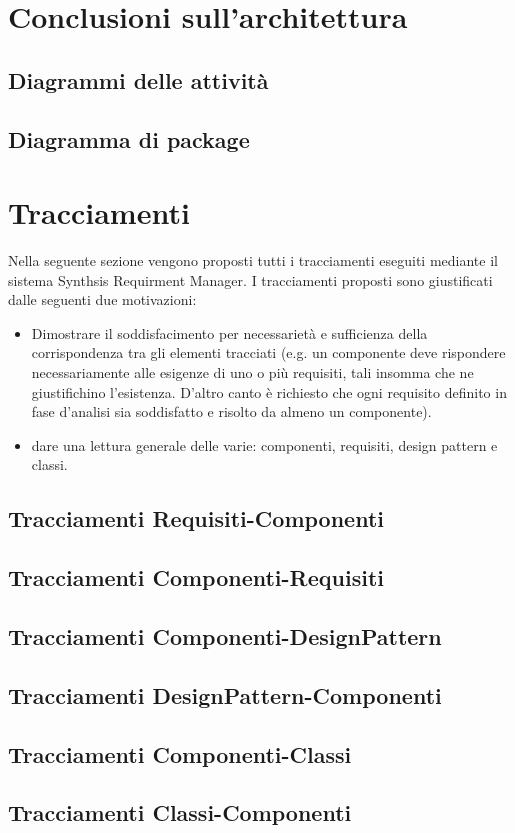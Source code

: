 \clearpage

\section{Conclusioni sull'architettura}

\subsection{Diagrammi delle attività}

\subsection{Diagramma di package}

\clearpage

\section{Tracciamenti}
Nella seguente sezione vengono proposti tutti i tracciamenti eseguiti mediante il sistema Synthsis Requirment Manager. I tracciamenti proposti sono giustificati dalle seguenti due motivazioni:

\begin{itemize}
	\item Dimostrare il soddisfacimento per necessarietà e sufficienza della corrispondenza tra gli elementi tracciati (e.g. un componente deve rispondere necessariamente alle esigenze di uno o più requisiti, tali insomma che ne giustifichino l'esistenza. D'altro canto è richiesto che ogni requisito definito in fase d'analisi sia soddisfatto e risolto da almeno un componente).
	\item dare una lettura generale delle varie: componenti, requisiti, design pattern e classi.
\end{itemize}

\subsection{Tracciamenti Requisiti-Componenti}

\subsection{Tracciamenti Componenti-Requisiti}

\subsection{Tracciamenti Componenti-DesignPattern}

\subsection{Tracciamenti DesignPattern-Componenti}

\subsection{Tracciamenti Componenti-Classi}

\subsection{Tracciamenti Classi-Componenti}

